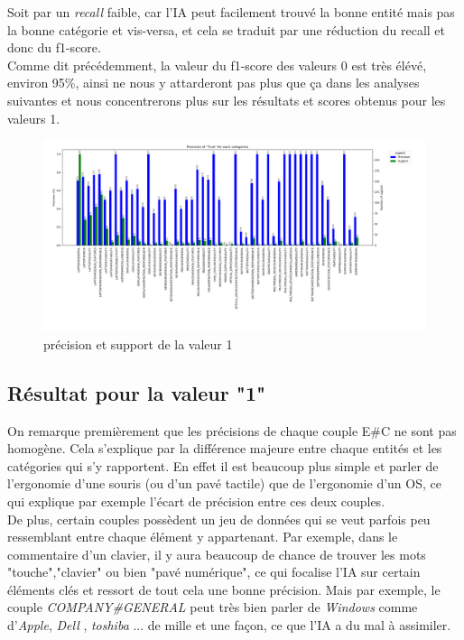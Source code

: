 \documentclass[12pt ,a4paper ]{article}
\begin{document}
\begin{multicols}{2}
\noindent Soit par un \textit{recall} faible, car l'IA peut facilement trouvé la bonne entité mais pas la bonne catégorie et vis-versa, et cela se traduit par une réduction du recall et donc du f1-score.\\

Comme dit précédemment, la valeur du f1-score des valeurs 0 est très élévé, environ 95\%, ainsi ne nous y attarderont pas plus que ça dans les analyses suivantes et nous concentrerons plus sur les résultats et scores obtenus pour les valeurs 1.

\begin{figure}[t]
    \begin{center}
        \includegraphics[width=1.15\textwidth]{true_data_plot.png}
    \end{center}
    \caption{précision et support de la valeur 1}
\end{figure}
\newpage
\subsection{Résultat pour la valeur "1"}
On remarque premièrement que les précisions de chaque couple E\#C ne sont pas homogène. Cela s'explique par la différence majeure entre chaque entités et les catégories qui s'y rapportent. En effet il est beaucoup plus simple et parler de l'ergonomie d'une souris (ou d'un pavé tactile) que de l'ergonomie d'un OS, ce qui explique par exemple l'écart de précision entre ces deux couples. \\

De plus, certain couples possèdent un jeu de données qui se veut parfois peu ressemblant entre chaque élément y appartenant. Par exemple, dans le commentaire d'un clavier, il y aura beaucoup de chance de trouver les mots "touche","clavier" ou bien "pavé numérique", ce qui focalise l'IA sur certain éléments clés et ressort de tout cela une bonne précision. Mais par exemple, le couple \textit{COMPANY\#GENERAL} peut très bien parler de \textit{Windows} comme d'\textit{Apple}, \textit{Dell} , \textit{toshiba} ... de mille et une façon, ce que l'IA a du mal à assimiler. \\


\end{multicols}
\end{document}
